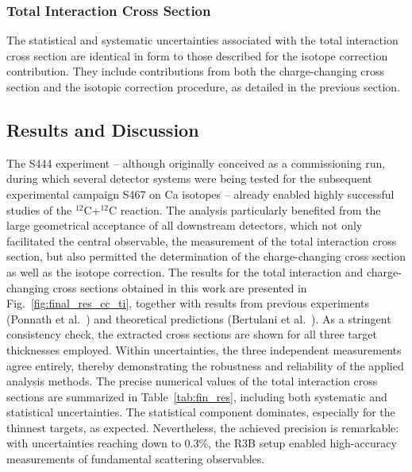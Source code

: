 \subsubsection{Total Interaction Cross Section}

The statistical and systematic uncertainties associated with the total interaction cross section are identical in form to those described for the isotope correction contribution. They include contributions from both the charge-changing cross section and the isotopic correction procedure, as detailed in the previous section.


\clearpage

\subsection{ Results and Discussion}
The S444 experiment -- although originally conceived as a commissioning run, during which several detector systems were being tested for the subsequent experimental campaign S467 on Ca isotopes -- already enabled highly successful studies of the $^{12}$C+$^{12}$C reaction. The analysis particularly benefited from the large geometrical acceptance of all downstream detectors, which not only facilitated the central observable, the measurement of the total interaction cross section, but also permitted the determination of the charge-changing cross section as well as the isotope correction.\newline
The results for the total interaction and charge-changing cross sections obtained in this work are presented in Fig.~\ref{fig:final_res_cc_ti}, together with results from previous experiments (Ponnath et al.~\cite{ponnath2024measurement}) and theoretical predictions (Bertulani et al.~\cite{bertulani2010pauli,teixeira2022nuclear}). As a stringent consistency check, the extracted cross sections are shown for all three target thicknesses employed. Within uncertainties, the three independent measurements agree entirely, thereby demonstrating the robustness and reliability of the applied analysis methods.\newline
The precise numerical values of the total interaction cross sections are summarized in Table~\ref{tab:fin_res}, including both systematic and statistical uncertainties. The statistical component dominates, especially for the thinnest targets, as expected. Nevertheless, the achieved precision is remarkable: with uncertainties reaching down to 0.3\%, the R3B setup enabled high-accuracy measurements of fundamental scattering observables.\newline
